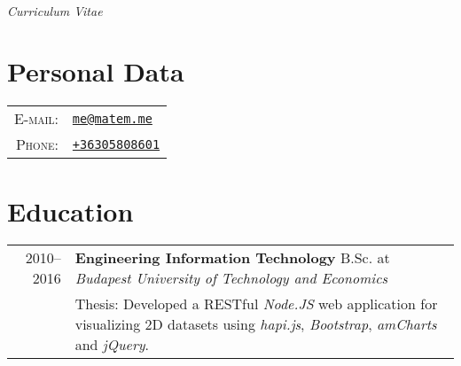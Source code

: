 \documentclass[a4paper,10pt]{article} %
\begin{document}
\pagestyle{empty} %

\par{}\\ \emph{Curriculum Vitae}\bigskip

\section{Personal Data}
\begin{tabular}{rl}
\textsc{E-mail:} & \href{mailto:me@matem.me}{\texttt{me@matem.me}} \\
\textsc{Phone:} & \href{tel:+36305808601}{\texttt{+36305808601}}
\end{tabular}

\section{Education}
\begin{tabular}{r|p{12.5cm}}
\textsc{2010--2016} & \textbf{Engineering Information Technology} B.Sc. at \emph{Budapest University of Technology and Economics}\\
& \footnotesize{Thesis: } Developed a RESTful \emph{Node.JS} web application for visualizing 2D datasets using \emph{hapi.js}, \emph{Bootstrap}, \emph{amCharts}  and \emph{jQuery}.\\
\end{tabular}
\end{document}
